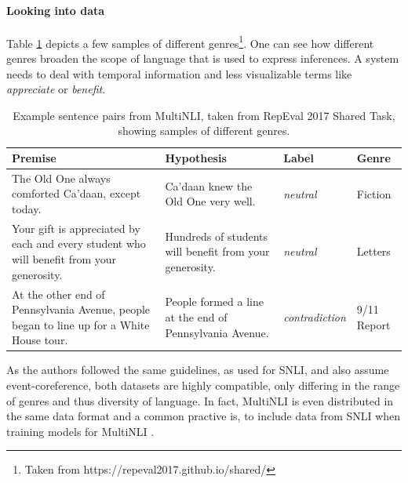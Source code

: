 \paragraph*{Looking into data}
Table \ref{table:multinli_example} depicts a few samples of different genres\footnote{Taken from https://repeval2017.github.io/shared/}. One can see how different genres broaden the scope of language that is used to express inferences. A system needs to deal with temporal information and less visualizable terms like \textit{appreciate} or \textit{benefit}.
\begin{center}
\begin{table}[h]
\begin{center}
\begin{tabular}{llll}
\textbf{Premise} & \textbf{Hypothesis} & \textbf{Label}  & \textbf{Genre} \\
\toprule
\multirow{3}{*}{\parbox{6cm}{The Old One always comforted Ca'daan, except today.}} & \multirow{3}{*}{\parbox{6cm}{Ca'daan knew the Old One very well.}} & & \\
& & \textit{neutral} & Fiction \\
& & & \\
\midrule
\multirow{3}{*}{\parbox{6cm}{Your gift is appreciated by each and every student who will benefit from your generosity.}} & \multirow{3}{*}{\parbox{6cm}{Hundreds of students will benefit from your generosity.}} & &\\
&  & \textit{neutral} & Letters \\
& & & \\
\midrule
\multirow{3}{*}{\parbox{6cm}{At the other end of Pennsylvania Avenue, people began to line up for a White House tour.}} & \multirow{3}{*}{\parbox{6cm}{People formed a line at the end of Pennsylvania Avenue.}} &  & \\
& & \textit{contradiction} & 9/11 Report \\
& & & \\

\bottomrule
\end{tabular}
\end{center}
\caption{Example sentence pairs from \ac{MultiNLI}, taken from RepEval 2017 Shared Task, showing samples of different genres.}
\label{table:multinli_example}
\end{table}
\end{center}
As the authors followed the same guidelines, as used for \ac{SNLI}, and also assume event-coreference, both datasets are highly compatible, only differing in the range of genres and thus diversity of language. In fact, \ac{MultiNLI} is even distributed in the same data format and a common practive is, to include data from \ac{SNLI} when training models for \ac{MultiNLI} \citep{nie2017shortcut,balazs2017refining,yang2017character}.

